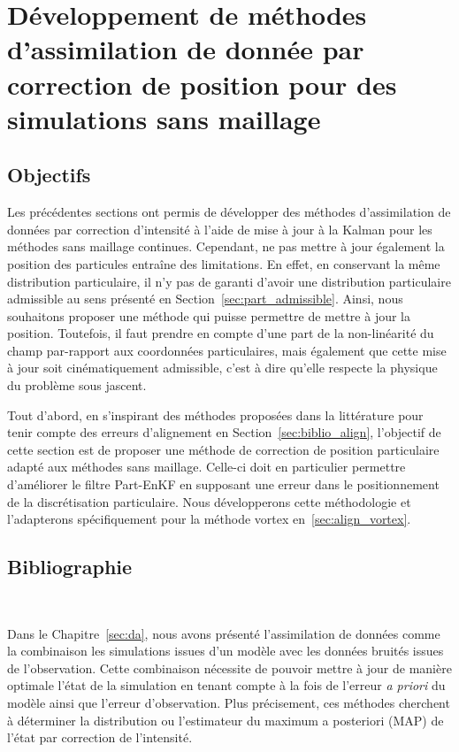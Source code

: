 
\chapter{Développement de méthodes d'assimilation de donnée par correction de position pour des simulations sans maillage}

\section{Objectifs}

Les précédentes sections ont permis de développer des méthodes d'assimilation de données par correction d'intensité à l'aide de mise à jour à la Kalman pour les méthodes sans maillage continues. Cependant, ne pas mettre à jour également la position des particules entraîne des limitations. En effet, en conservant la même distribution particulaire, il n'y pas de garanti d'avoir une distribution particulaire admissible au sens présenté en Section~\ref{sec:part_admissible}.
Ainsi, nous souhaitons proposer une méthode qui puisse permettre de mettre à jour la position. Toutefois, il faut prendre en compte d'une part de la non-linéarité du champ par-rapport aux coordonnées particulaires, mais également que cette mise à jour soit cinématiquement admissible, c'est à dire qu'elle respecte la physique du problème sous jascent.

Tout d'abord, en s'inspirant des méthodes proposées dans la littérature pour tenir compte des erreurs d'alignement en Section~\ref{sec:biblio_align}, l'objectif de cette section est de proposer une méthode de correction de position particulaire adapté aux méthodes sans maillage. Celle-ci doit en particulier permettre d'améliorer le filtre Part-EnKF en supposant une erreur dans le positionnement de la discrétisation particulaire. Nous développerons cette méthodologie et l'adapterons spécifiquement pour la méthode vortex en~\ref{sec:align_vortex}.

\section{Bibliographie}~\label{sec:biblio_align}

Dans le Chapitre~\ref{sec:da}, nous avons présenté l'assimilation de données comme la combinaison les simulations issues d'un modèle avec les données bruités issues de l'observation. Cette combinaison nécessite de pouvoir mettre à jour de manière optimale l'état de la simulation en tenant compte à la fois de l'erreur \textit{a priori} du modèle ainsi que l'erreur d'observation. Plus précisement, ces méthodes cherchent à déterminer la distribution ou l'estimateur du maximum a posteriori (MAP) de l'état par correction de l'intensité.

